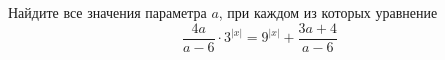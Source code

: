 \begin{ex}
	\begin{condition}
		Найдите все значения параметра \( a \), при каждом из которых уравнение
		\[ \dfrac{4a}{a-6}\cdot3^{|x|}=9^{|x|}+\dfrac{3a+4}{a-6} \]
	\end{condition}
\end{ex}